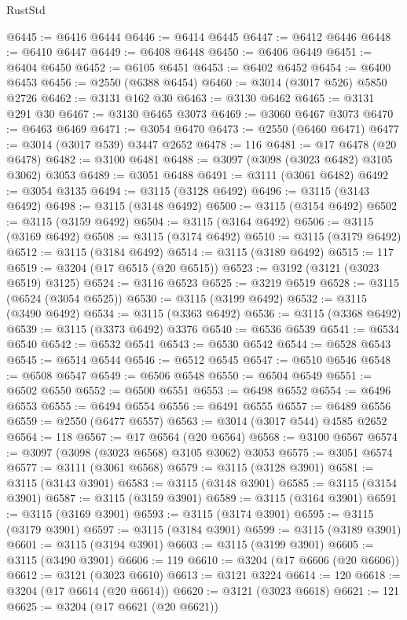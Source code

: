 \begin{lexlean}{RustStd}
\begin{coremodule}
@6445 := @6416 @6444
@6446 := @6414 @6445
@6447 := @6412 @6446
@6448 := @6410 @6447
@6449 := @6408 @6448
@6450 := @6406 @6449
@6451 := @6404 @6450
@6452 := @6105 @6451
@6453 := @6402 @6452
@6454 := @6400 @6453
@6456 := @2550 (@6388 @6454)
@6460 := @3014 (@3017 @526) @5850 @2726
@6462 := @3131 @162 @30
@6463 := @3130 @6462
@6465 := @3131 @291 @30
@6467 := @3130 @6465 @3073
@6469 := @3060 @6467 @3073
@6470 := @6463 @6469
@6471 := @3054 @6470
@6473 := @2550 (@6460 @6471)
@6477 := @3014 (@3017 @539) @3447 @2652
@6478 := 116
@6481 := @17 @6478 (@20 @6478)
@6482 := @3100 @6481
@6488 := @3097 (@3098 (@3023 @6482) @3105 @3062) @3053
@6489 := @3051 @6488
@6491 := @3111 (@3061 @6482)
@6492 := @3054 @3135
@6494 := @3115 (@3128 @6492)
@6496 := @3115 (@3143 @6492)
@6498 := @3115 (@3148 @6492)
@6500 := @3115 (@3154 @6492)
@6502 := @3115 (@3159 @6492)
@6504 := @3115 (@3164 @6492)
@6506 := @3115 (@3169 @6492)
@6508 := @3115 (@3174 @6492)
@6510 := @3115 (@3179 @6492)
@6512 := @3115 (@3184 @6492)
@6514 := @3115 (@3189 @6492)
@6515 := 117
@6519 := @3204 (@17 @6515 (@20 @6515))
@6523 := @3192 (@3121 (@3023 @6519) @3125)
@6524 := @3116 @6523
@6525 := @3219 @6519
@6528 := @3115 (@6524 (@3054 @6525))
@6530 := @3115 (@3199 @6492)
@6532 := @3115 (@3490 @6492)
@6534 := @3115 (@3363 @6492)
@6536 := @3115 (@3368 @6492)
@6539 := @3115 (@3373 @6492) @3376
@6540 := @6536 @6539
@6541 := @6534 @6540
@6542 := @6532 @6541
@6543 := @6530 @6542
@6544 := @6528 @6543
@6545 := @6514 @6544
@6546 := @6512 @6545
@6547 := @6510 @6546
@6548 := @6508 @6547
@6549 := @6506 @6548
@6550 := @6504 @6549
@6551 := @6502 @6550
@6552 := @6500 @6551
@6553 := @6498 @6552
@6554 := @6496 @6553
@6555 := @6494 @6554
@6556 := @6491 @6555
@6557 := @6489 @6556
@6559 := @2550 (@6477 @6557)
@6563 := @3014 (@3017 @544) @4585 @2652
@6564 := 118
@6567 := @17 @6564 (@20 @6564)
@6568 := @3100 @6567
@6574 := @3097 (@3098 (@3023 @6568) @3105 @3062) @3053
@6575 := @3051 @6574
@6577 := @3111 (@3061 @6568)
@6579 := @3115 (@3128 @3901)
@6581 := @3115 (@3143 @3901)
@6583 := @3115 (@3148 @3901)
@6585 := @3115 (@3154 @3901)
@6587 := @3115 (@3159 @3901)
@6589 := @3115 (@3164 @3901)
@6591 := @3115 (@3169 @3901)
@6593 := @3115 (@3174 @3901)
@6595 := @3115 (@3179 @3901)
@6597 := @3115 (@3184 @3901)
@6599 := @3115 (@3189 @3901)
@6601 := @3115 (@3194 @3901)
@6603 := @3115 (@3199 @3901)
@6605 := @3115 (@3490 @3901)
@6606 := 119
@6610 := @3204 (@17 @6606 (@20 @6606))
@6612 := @3121 (@3023 @6610)
@6613 := @3121 @3224
@6614 := 120
@6618 := @3204 (@17 @6614 (@20 @6614))
@6620 := @3121 (@3023 @6618)
@6621 := 121
@6625 := @3204 (@17 @6621 (@20 @6621))

\end{coremodule}
\end{lexlean}

